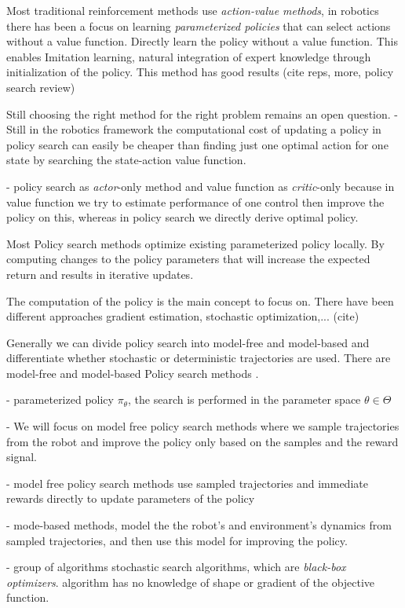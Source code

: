 Most traditional reinforcement methods use \textit{action-value methods}, in robotics
there has been a focus on learning \textit{parameterized policies} that can select
actions without a value function.
Directly learn the policy without a value function.
This enables Imitation learning, natural integration of expert knowledge through
initialization of the policy.
This method has good results (cite reps, more, policy search review)

Still choosing the right method for the right problem remains an open question.
- Still in the robotics framework the computational cost of updating
a policy in policy search can easily be cheaper than finding just one
optimal action for one state by searching the state-action value function.

- policy search as \textit{actor}-only method and value function as \textit{critic}-only
because in value function we try to estimate performance of one control then improve
the policy on this, whereas in policy search we directly derive optimal policy.

Most Policy search methods optimize existing parameterized policy locally. By computing
changes to the policy parameters that will increase the expected return and results
in iterative updates.

The computation of the policy is the main concept to focus on. There have
been different approaches gradient estimation, stochastic optimization,... (cite)

Generally we can divide policy search into model-free and model-based and
differentiate whether stochastic or deterministic trajectories are used.
There are model-free and model-based Policy search methods \citet{deisenroth2013survey}.

- parameterized policy $\pi_{\theta}$, the search is performed in the parameter space
$\theta \in \Theta$

- We will focus on model free policy search methods where we sample trajectories from
the robot and improve the policy only based on the samples and the reward signal.

- model free policy search methods use sampled trajectories and immediate rewards directly
to update parameters of the policy

- mode-based methods, model the the robot's and environment's dynamics from sampled
  trajectories, and then use this model for improving the policy.

- group of algorithms stochastic search algorithms, which are \textit{black-box optimizers}.
algorithm has no knowledge of shape or gradient of the objective function.


